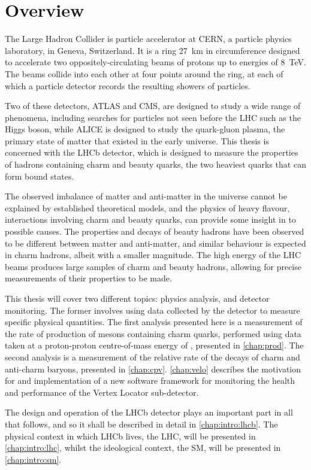 \chapter{Overview}
\label{chap:intro:overview}

The Large Hadron Collider is particle accelerator at CERN, a particle physics 
laboratory, in Geneva, Switzerland.
It is a ring \SI{27}{\kilo\metre} in circumference designed to accelerate two 
oppositely-circulating beams of protons up to energies of \SI{8}{\TeV}.
The beams collide into each other at four points around the ring, at each of 
which a particle detector records the resulting showers of particles.

Two of these detectors, ATLAS and CMS, are designed to study a wide range of 
phenomena, including searches for particles not seen before the \ac{LHC} such 
as the Higgs boson, while ALICE is designed to study the quark-gluon plasma, 
the primary state of matter that existed in the early universe.
This thesis is concerned with the LHCb detector, which is designed to measure 
the properties of hadrons containing charm and beauty quarks, the two heaviest 
quarks that can form bound states.

The observed imbalance of matter and anti-matter in the universe cannot be 
explained by established theoretical models, and the physics of heavy flavour, 
interactions involving charm and beauty quarks, can provide some insight in to 
possible causes.
The properties and decays of beauty hadrons have been observed to be different 
between matter and anti-matter, and similar behaviour is expected in charm 
hadrons, albeit with a smaller magnitude.
The high energy of the \ac{LHC} beams produces large samples of charm and 
beauty hadrons, allowing for precise measurements of their properties to be 
made.

This thesis will cover two different topics: physics analysis, and detector 
monitoring.
The former involves using data collected by the detector to measure specific 
physical quantities.
The first analysis presented here is a measurement of the rate of production of 
mesons containing charm quarks, performed using data taken at a proton-proton 
centre-of-mass energy of \runtwocom, presented in \cref{chap:prod}.
The second analysis is a measurement of the relative rate of the decays of 
charm and anti-charm baryons, presented in \cref{chap:cpv}.
\cref{chap:velo} describes the motivation for and implementation of a new 
software framework for monitoring the health and performance of the Vertex 
Locator sub-detector.

The design and operation of the LHCb detector plays an important part in all 
that follows, and so it shall be described in detail in \cref{chap:intro:lhcb}.
The physical context in which LHCb lives, the \ac{LHC}, will be presented 
in \cref{chap:intro:lhc}, whilst the ideological context, the \ac{SM}, will be 
presented in \cref{chap:intro:sm}.
